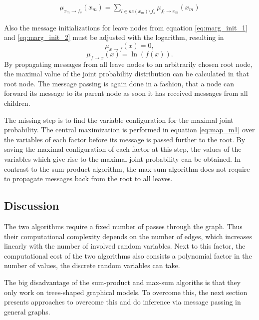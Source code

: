 \documentclass{sigkdd}
\begin{document}
\begin{equation}\label{eq:map_m2}
\begin{split}
\mu_{x_m \rightarrow f_s}(x_m) = \sum_{l \in ne(x_m) \setminus f_s} \mu_{f_l \rightarrow x_m}(x_m)
\end{split}
\end{equation}

Also the message initializations for leave nodes from equation \ref{eq:marg_init_1} and \ref{eq:marg_init_2} must be adjusted with the logarithm, resulting in
\begin{equation}\label{eq:marg_init2_1}
\mu_{x \rightarrow f}(x) = 0,
\end{equation}
\begin{equation}\label{eq:marg_init2_2}
\mu_{f \rightarrow x}(x) = \ln(f(x)).
\end{equation}
By propagating messages from all leave nodes to an arbitrarily chosen root node, the maximal value of the joint probability distribution can be calculated in that root node. The message passing is again done in a fashion, that a node can forward its message to its parent node as soon it has received messages from all children.

The missing step is to find the variable configuration for the maximal joint probability. The central maximization is performed in equation \ref{eq:map_m1} over the variables of each factor before its message is passed further to the root. By saving the maximal configuration of each factor at this step, the values of the variables which give rise to the maximal joint probability can be obtained. In contrast to the sum-product algorithm, the max-sum algorithm does not require to propagate messages back from the root to all leaves.

\subsection{Discussion}
The two algorithms require a fixed number of passes through the graph. Thus their computational complexity depends on the number of edges, which increases linearly with the number of involved random variables. Next to this factor, the computational cost of the two algorithms also consists a polynomial factor in the number of values, the discrete random variables can take.

The big disadvantage of the sum-product and max-sum algoriths is that they only work on trees-shaped graphical models. To overcome this, the next section presents approaches to overcome this and do inference via message passing in general graphs.
\end{document}
